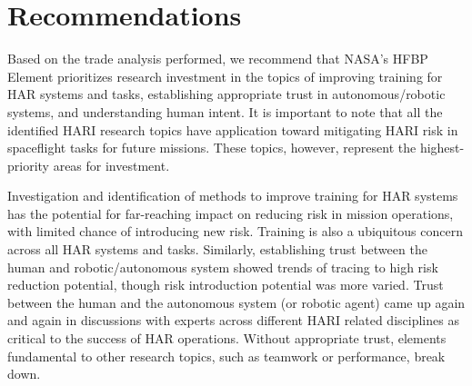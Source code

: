 

\section{Recommendations}
Based on the trade analysis performed, we recommend that NASA’s HFBP Element prioritizes research investment in the topics of improving training for HAR systems and tasks, establishing appropriate trust in autonomous/robotic systems, and understanding human intent. It is important to note that all the identified HARI research topics have application toward mitigating HARI risk in spaceflight tasks for future missions. These topics, however, represent the highest-priority areas for investment.

Investigation and identification of methods to improve training for HAR systems has the potential for far-reaching impact on reducing risk in mission operations, with limited chance of introducing new risk. Training is also a ubiquitous concern across all HAR systems and tasks. Similarly, establishing trust between the human and robotic/autonomous system showed trends of tracing to high risk reduction potential, though risk introduction potential was more varied. Trust between the human and the autonomous system (or robotic agent) came up again and again in discussions with experts across different HARI related disciplines as critical to the success of HAR operations. Without appropriate trust, elements fundamental to other research topics, such as teamwork or performance, break down.

